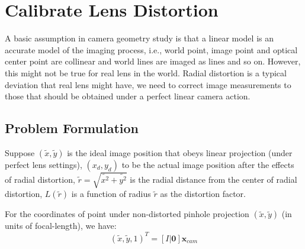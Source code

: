 \documentclass[conference]{IEEEtran}
\newcommand{\mat}[1]{\mathbf{#1}} %
\begin{document}




\maketitle





%
\IEEEpeerreviewmaketitle


\section{Calibrate Lens Distortion}
A basic assumption in camera geometry study is that a linear model is an accurate model of the imaging process, i.e., world point, image point and optical center point are collinear and world lines are imaged as lines and so on. However, this might not be true for real lens in the world. Radial distortion is a typical deviation that real lens might have, we need to correct image measurements to those that should be obtained under a perfect linear camera action.

\subsection{Problem Formulation}
Suppose $(\tilde{x}, \tilde{y})$ is the ideal image position that obeys linear projection (under perfect lens settings), $(x_d, y_d)$ to be the actual image position after the effects of radial distortion, $\tilde{r} = \sqrt{\tilde{x^2} + \tilde{y^2}}$ is the radial distance from the center of radial distortion, $L(\tilde{r})$ is a function of radius $\tilde{r}$ as the distortion factor. 

For the coordinates of point under non-distorted pinhole projection $(\tilde{x}, \tilde{y})$ (in units of focal-length), we have:
\begin{equation}
	(\tilde{x}, \tilde{y}, 1)^T = [ I| \mat{0}] \mat{x}_{cam}
\end{equation}
\end{document}
